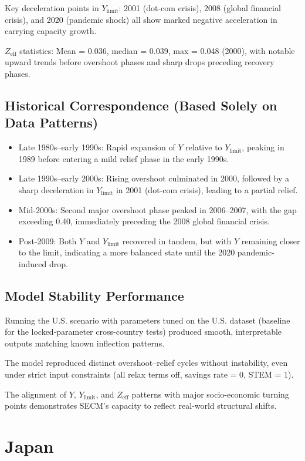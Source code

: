 \documentclass[12pt,a4paper]{article}
\begin{document}
Key deceleration points in $Y_{\text{limit}}$: 2001 (dot-com crisis), 2008 (global financial crisis), and 2020 (pandemic shock) all show marked negative acceleration in carrying capacity growth.

$Z_{\text{eff}}$ statistics: Mean = 0.036, median = 0.039, max = 0.048 (2000), with notable upward trends before overshoot phases and sharp drops preceding recovery phases.

\subsection{Historical Correspondence (Based Solely on Data Patterns)}
\begin{itemize}
    \item Late 1980s–early 1990s: Rapid expansion of $Y$ relative to $Y_{\text{limit}}$, peaking in 1989 before entering a mild relief phase in the early 1990s.
    \item Late 1990s–early 2000s: Rising overshoot culminated in 2000, followed by a sharp deceleration in $Y_{\text{limit}}$ in 2001 (dot-com crisis), leading to a partial relief.
    \item Mid-2000s: Second major overshoot phase peaked in 2006–2007, with the gap exceeding 0.40, immediately preceding the 2008 global financial crisis.
    \item Post-2009: Both $Y$ and $Y_{\text{limit}}$ recovered in tandem, but with $Y$ remaining closer to the limit, indicating a more balanced state until the 2020 pandemic-induced drop.
\end{itemize}

\subsection{Model Stability Performance}
Running the U.S. scenario with parameters tuned on the U.S. dataset (baseline for the locked-parameter cross-country tests) produced smooth, interpretable outputs matching known inflection patterns.

The model reproduced distinct overshoot–relief cycles without instability, even under strict input constraints (all relax terms off, savings rate = 0, STEM = 1).

The alignment of $Y$, $Y_{\text{limit}}$, and $Z_{\text{eff}}$ patterns with major socio-economic turning points demonstrates SECM’s capacity to reflect real-world structural shifts.
\section{Japan}
\end{document}
